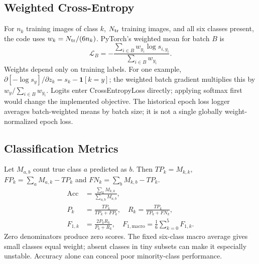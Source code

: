 \documentclass[conference]{IEEEtran}
\begin{document}
\subsection{Weighted Cross-Entropy}
For $n_k$ training images of class $k$, $N_{\rm tr}$ training images, and all six classes present, the code uses $w_k=N_{\rm tr}/(6n_k)$. PyTorch's weighted mean for batch $B$ is
\begin{equation}
\mathcal L_B=-\frac{\sum_{i\in B}w_{y_i}\log s_{i,y_i}}{\sum_{i\in B}w_{y_i}}.
\end{equation}
Weights depend only on training labels. For one example, $\partial[-\log s_y]/\partial z_k=s_k-\mathbf1[k=y]$; the weighted batch gradient multiplies this by $w_y/\sum_{i\in B}w_{y_i}$. Logits enter CrossEntropyLoss directly; applying softmax first would change the implemented objective. The historical epoch loss logger averages batch-weighted means by batch size; it is not a single globally weight-normalized epoch loss.

\subsection{Classification Metrics}
Let $M_{a,b}$ count true class $a$ predicted as $b$. Then $TP_k=M_{k,k}$, $FP_k=\sum_a M_{a,k}-TP_k$ and $FN_k=\sum_b M_{k,b}-TP_k$.
\begin{align}
\mathrm{Acc}&=\frac{\sum_k M_{k,k}}{\sum_{a,b}M_{a,b}},\\
P_k&=\frac{TP_k}{TP_k+FP_k},\quad R_k=\frac{TP_k}{TP_k+FN_k},\\
F_{1,k}&=\frac{2P_kR_k}{P_k+R_k},\quad
F_{1,\mathrm{macro}}=\frac16\sum_{k=0}^{5}F_{1,k}.
\end{align}
Zero denominators produce zero scores. The fixed six-class macro average gives small classes equal weight; absent classes in tiny subsets can make it especially unstable. Accuracy alone can conceal poor minority-class performance.
\end{document}
